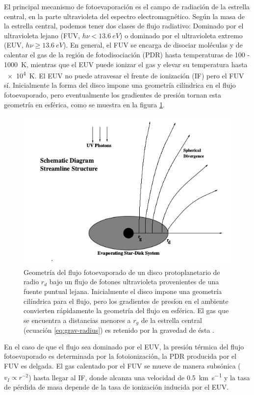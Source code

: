 El principal mecanismo de fotoevaporación es el campo de radiación de la estrella central, en la parte ultravioleta del espectro electromagnético. Según la masa de la estrella central, podemos tener dos clases de flujo radiativo: Dominado por el ultravioleta lejano (FUV, $h\nu < \SI{13.6}{eV}$) o dominado por el ultravioleta extremo (EUV, $h\nu \geq \SI{13.6}{eV}$). En general, el FUV se encarga de disociar moléculas y de calentar el gas de la región de fotodisociación (PDR) hasta temperaturas de \SI{100}{} - \SI{1000}{K}, mientras que el EUV puede ionizar el gas y elevar su temperatura hasta \SI{e4}{K}. El EUV no puede atravesar el frente de ionización (IF) pero el FUV sí. Inicialmente la forma del disco impone una geometría cilíndrica en el flujo fotoevaporado, pero eventualmente los gradientes de presión tornan esta geometría en esférica, como se muestra en la figura \ref{fig:flux-geometry}.

\begin{figure}
  \centering
  \includegraphics[width=0.7\linewidth]{./Figures/Johnstone-1}
  \caption{Geometría del flujo fotoevaporado de un disco protoplanetario de radio $r_d$ bajo un flujo de fotones ultravioleta provenientes de una fuente puntual lejana. Inicialmente el disco impone una geometría cilíndrica para el flujo, pero los gradientes de presíon en el ambiente convierten rápidamente la geometría del flujo en esférica. El gas que se encuentra a distancias menores a $r_g$ de la estrella central (ecuación \ref{eq:grav-radius}) es retenido por la gravedad de ésta \citep{Johnstone:1998}.}
  \label{fig:flux-geometry}
\end{figure}

En el caso de que el flujo sea dominado por el EUV, la presión térmica del flujo fotoevaporado es determinada por la fotoionización, la PDR producida por el FUV es delgada. El gas calentado por el FUV se mueve de manera subsónica ($v_I \propto r^{-2}$) hasta llegar al IF, donde alcanza una velocidad de \SI{0.5}{km.s^{-1}} y la tasa de pérdida de masa depende de la tasa de ionización inducida por el EUV.

